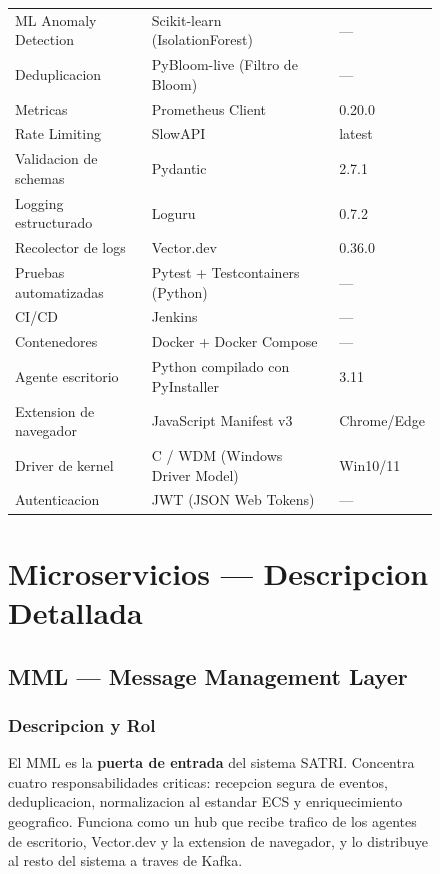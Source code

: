\documentclass[12pt, a4paper]{report}
\begin{document}
\begin{figure}[htbp]
\begin{table}[H]
\begin{tabular}{@{}p{4cm}p{5cm}p{3cm}@{}}
ML Anomaly Detection     & Scikit-learn (IsolationForest)            & --- \\
Deduplicacion            & PyBloom-live (Filtro de Bloom)            & --- \\
Metricas                 & Prometheus Client                         & 0.20.0 \\
Rate Limiting            & SlowAPI                                   & latest \\
Validacion de schemas    & Pydantic                                  & 2.7.1 \\
Logging estructurado     & Loguru                                    & 0.7.2 \\
Recolector de logs       & Vector.dev                                & 0.36.0 \\
Pruebas automatizadas    & Pytest + Testcontainers (Python)          & --- \\
CI/CD                    & Jenkins                                   & --- \\
Contenedores             & Docker + Docker Compose                   & --- \\
Agente escritorio        & Python compilado con PyInstaller          & 3.11 \\
Extension de navegador   & JavaScript Manifest v3                    & Chrome/Edge \\
Driver de kernel         & C / WDM (Windows Driver Model)            & Win10/11 \\
Autenticacion            & JWT (JSON Web Tokens)                     & --- \\
\bottomrule
\end{tabular}
\end{table}

\chapter{Microservicios --- Descripcion Detallada}

\section{MML --- Message Management Layer}

\subsection{Descripcion y Rol}
El MML es la \textbf{puerta de entrada} del sistema SATRI. Concentra cuatro responsabilidades criticas: recepcion segura de eventos, deduplicacion, normalizacion al estandar ECS y enriquecimiento geografico. Funciona como un hub que recibe trafico de los agentes de escritorio, Vector.dev y la extension de navegador, y lo distribuye al resto del sistema a traves de Kafka.


\end{figure}
\end{document}
